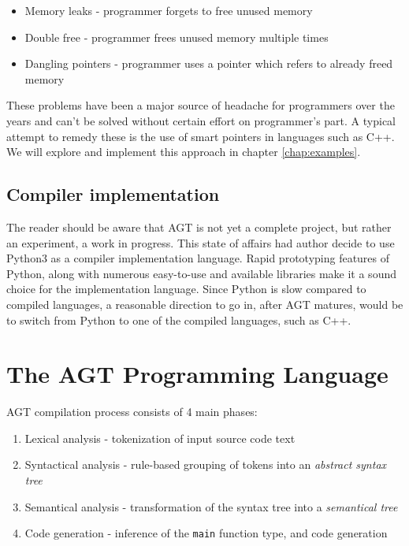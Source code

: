 \documentclass[times, utf8, diplomski]{fer}
\theoremstyle{definition}
\begin{document}
\begin{itemize}
    \item Memory leaks - programmer forgets to free unused memory
    \item Double free - programmer frees unused memory multiple times
    \item Dangling pointers - programmer uses a pointer which refers to already freed memory
\end{itemize}

These problems have been a major source of headache for programmers over the years and can't be solved
without certain effort on programmer's part. A typical attempt to remedy these is the use of 
smart pointers in languages such as C++. We will explore and implement this approach in 
chapter \ref{chap:examples}.

\section{Compiler implementation}

The reader should be aware that AGT is not yet a complete project, but rather an experiment, 
a work in progress. This state of affairs had author decide to use Python3 as a compiler implementation
language. Rapid prototyping features of Python, along with numerous easy-to-use and available libraries
make it a sound choice for the implementation language. Since Python is slow compared to compiled
languages, a reasonable direction to go in, after AGT matures, would be to switch from Python
to one of the compiled languages, such as C++.

\chapter{The AGT Programming Language}\label{chap:indepth}

AGT compilation process consists of 4 main phases: 

\begin{enumerate}
\item Lexical analysis - tokenization of input source code text
\item Syntactical analysis - rule-based grouping of tokens into an \textit{abstract syntax tree}
\item Semantical analysis - transformation of the syntax tree into a \textit{semantical tree}
\item Code generation - inference of the \texttt{main} function type, and code generation
\end{enumerate}
\end{document}
